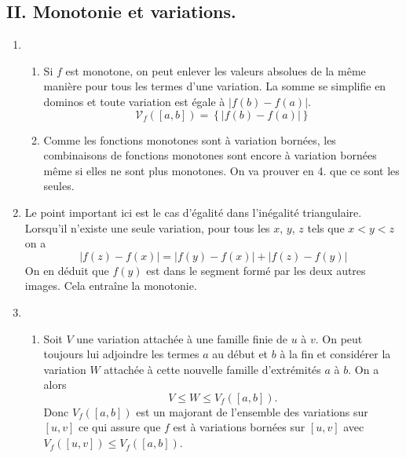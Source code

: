 \subsection*{II. Monotonie et variations.}
\begin{enumerate}
  \item 
\begin{enumerate}
  \item Si $f$ est monotone, on peut enlever les valeurs absolues de la même manière pour tous les termes d'une variation. La somme se simplifie en dominos et toute variation est égale à $|f(b)-f(a)|$.
\begin{displaymath}
  \mathcal{V}_f([a,b]) = \left\lbrace|f(b)-f(a)|\right\rbrace 
\end{displaymath}

  \item Comme les fonctions monotones sont à variation bornées, les combinaisons de fonctions monotones sont encore à variation bornées même si elles ne sont plus monotones. On va prouver en 4. que ce sont les seules.
\end{enumerate}

  \item
Le point important ici est le cas d'égalité dans l'inégalité triangulaire. Lorsqu'il n'existe une seule variation, pour tous les $x$, $y$, $z$ tels que $x <y <z$ on a
\begin{displaymath}
  |f(z) - f(x)| = |f(y)-f(x)| + |f(z) - f(y)|
\end{displaymath}
On en déduit que $f(y)$ est dans le segment formé par les deux autres images. Cela entraîne la monotonie.
  
  \item
\begin{enumerate}
  \item Soit $V$ une variation attachée à une famille finie de $u$ à $v$. On peut toujours lui adjoindre les termes $a$ au début et $b$ à la fin et considérer la variation $W$ attachée à cette nouvelle famille d'extrémités $a$ à $b$. On a alors
\begin{displaymath}
  V \leq W \leq V_f([a,b]).
\end{displaymath}
Donc $V_f([a,b])$ est un majorant de l'ensemble des variations sur $[u,v]$ ce qui assure que $f$ est à variations bornées sur $[u,v]$ avec $V_f([u,v]) \leq V_f([a,b])$.
   

\end{enumerate}
\end{enumerate}
